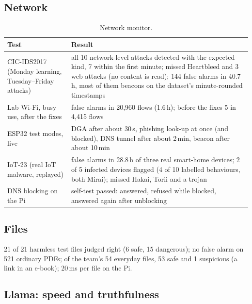 \documentclass[11pt,a4paper]{article}
\begin{document}
\subsection{Network}

\begin{table}[H]
\centering\small
\begin{tabularx}{\textwidth}{@{}>{\raggedright\arraybackslash}X>{\raggedright\arraybackslash}p{7.0cm}@{}}
\toprule
\textbf{Test} & \textbf{Result}\\
\midrule
CIC-IDS2017 (Monday learning, Tuesday--Friday attacks) & all 10 network-level attacks detected with the expected kind, 7 within the first minute; missed Heartbleed and 3 web attacks (no content is read); 144 false alarms in 40.7\,h, most of them beacons on the dataset's minute-rounded timestamps\\
Lab Wi-Fi, busy use, after the fixes & 0 false alarms in 20,960 flows (1.6\,h); before the fixes 5 in 4,415 flows\\
ESP32 test modes, live & DGA after about 30\,s, phishing look-up at once (and blocked), DNS tunnel after about 2\,min, beacon after about 10\,min\\
IoT-23 (real IoT malware, replayed) & 0 false alarms in 28.8\,h of three real smart-home devices; 2 of 5 infected devices flagged (4 of 10 labelled behaviours, both Mirai); missed Hakai, Torii and a trojan\\
DNS blocking on the Pi & self-test passed: answered, refused while blocked, answered again after unblocking\\
\bottomrule
\end{tabularx}
\caption{Network monitor.}
\end{table}

\subsection{Files}

21 of 21 harmless test files judged right (6 safe, 15 dangerous); no false alarm on 521 ordinary PDFs; of the team's 54
everyday files, 53 safe and 1 suspicious (a link in an e-book); 20\,ms per file on the Pi.

\subsection{Llama: speed and truthfulness}
\end{document}
